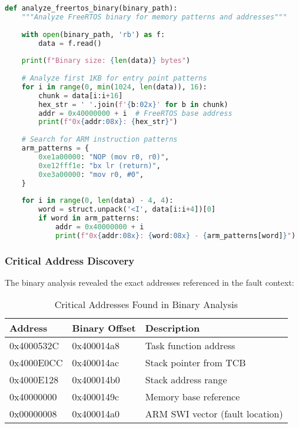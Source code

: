 \documentclass[11pt,a4paper]{article}
\begin{document}
\begin{lstlisting}[language=Python,caption={Binary Analysis Implementation}]
def analyze_freertos_binary(binary_path):
    """Analyze FreeRTOS binary for memory patterns and addresses"""
    
    with open(binary_path, 'rb') as f:
        data = f.read()
    
    print(f"Binary size: {len(data)} bytes")
    
    # Analyze first 1KB for entry point patterns
    for i in range(0, min(1024, len(data)), 16):
        chunk = data[i:i+16]
        hex_str = ' '.join(f'{b:02x}' for b in chunk)
        addr = 0x40000000 + i  # FreeRTOS base address
        print(f"0x{addr:08x}: {hex_str}")
    
    # Search for ARM instruction patterns
    arm_patterns = {
        0xe1a00000: "NOP (mov r0, r0)",
        0xe12fff1e: "bx lr (return)",
        0xe3a00000: "mov r0, #0",
    }
    
    for i in range(0, len(data) - 4, 4):
        word = struct.unpack('<I', data[i:i+4])[0]
        if word in arm_patterns:
            addr = 0x40000000 + i
            print(f"0x{addr:08x}: {word:08x} - {arm_patterns[word]}")
\end{lstlisting}

\subsubsection{Critical Address Discovery}

The binary analysis revealed the exact addresses referenced in the fault context:

\begin{table}[h]
\centering
\begin{tabular}{@{}lll@{}}
\toprule
\textbf{Address} & \textbf{Binary Offset} & \textbf{Description} \\
\midrule
0x4000532C & 0x400014a8 & Task function address \\
0x4000E0CC & 0x400014ac & Stack pointer from TCB \\
0x4000E128 & 0x400014b0 & Stack address range \\
0x40000000 & 0x4000149c & Memory base reference \\
0x00000008 & 0x400014a0 & ARM SWI vector (fault location) \\
\bottomrule
\end{tabular}
\caption{Critical Addresses Found in Binary Analysis}
\label{tab:addresses}
\end{table}
\end{document}
